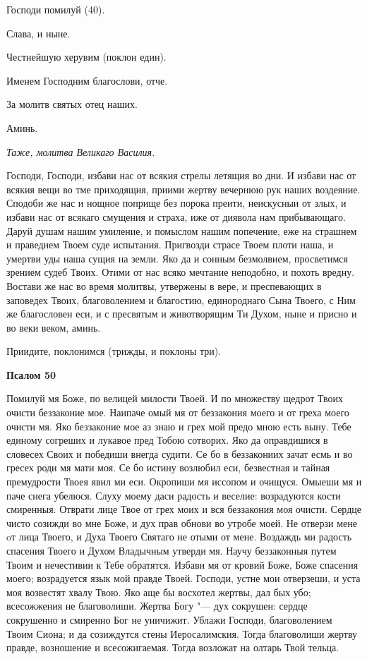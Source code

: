 Господи помилуй (40).


Слава, и ныне.


Честнейшую херувим (поклон един).


Именем Господним благослови, отче.


За молитв святых отец наших.


Аминь.


\itshape Таже, молитва Великаго Василия.\normalfont{}


Господи, Господи, избави нас от всякия стрелы летящия во дни. И избави нас от всякия вещи во тме приходящия, приими жертву вечернюю рук наших воздеяние. Сподоби же нас и нощное поприще без порока преити, неискусныи от злых, и избави нас от всякаго смущения и страха, иже от диявола нам прибывающаго. Даруй душам нашим умиление, и помыслом нашим попечение, еже на страшнем и праведнем Твоем суде испытания. Пригвозди страсе Твоем плоти наша, и умертви уды наша сущия на земли. Яко да и сонным безмолвием, просветимся зрением судеб Твоих. Отими от нас всяко мечтание неподобно, и похоть вредну. Востави же нас во время молитвы, утвержены в вере, и преспевающих в заповедех Твоих, благоволением и благостию, единороднаго Сына Твоего, с Ним же благословен еси, и с пресвятым и животворящим Ти Духом, ныне и присно и во веки веком, аминь.


Приидите, поклонимся (трижды, и поклоны три).







\bfseries Псалом 50\normalfont{}


Помилуй мя Боже, по велицей милости Твоей. И по множеству щедрот Твоих очисти беззаконие мое. Наипаче омый мя от беззакония моего и от греха моего очисти мя. Яко беззаконие мое аз знаю и грех мой предо мною есть выну. Тебе единому согреших и лукавое пред Тобою сотворих. Яко да оправдишися в словесех Своих и победиши внегда судити. Се бо в беззакониих зачат есмь и во гресех роди мя мати моя. Се бо истину возлюбил еси, безвестная и тайная премудрости Твоея явил ми еси. Окропиши мя иссопом и очищуся. Омыеши мя и паче снега убелюся. Слуху моему даси радость и веселие: возрадуются кости смиренныя. Отврати лице Твое от грех моих и вся беззакония моя очисти. Сердце чисто созижди во мне Боже, и дух прав обнови во утробе моей. Не отверзи мене oт лица Твоего, и Духа Твоего Святаго не отыми от мене. Воздаждь ми радость спасения Твоего и Духом Владычным утверди мя. Научу беззаконныя путем Твоим и нечестивии к Тебе обратятся. Избави мя от кровий Боже, Боже спасения моего; возрадуется язык мой правде Твоей. Господи, устне мои отверзеши, и уста моя возвестят хвалу Твою. Яко аще бы восхотел жертвы, дал бых убо; всесожжения не благоволиши. Жертва Богу "--- дух сокрушен: сердце сокрушенно и смиренно Бог не уничижит. Ублажи Господи, благоволением Твоим Сиона; и да созиждутся стены Иеросалимския. Тогда благоволиши жертву правде, возношение и всесожигаемая. Тогда возложат на олтарь Твой тельца.








